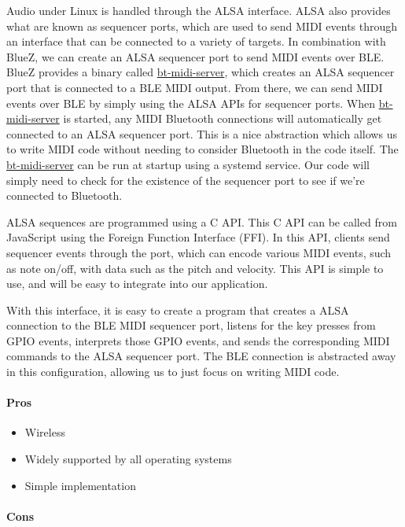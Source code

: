 Audio under Linux is handled through the ALSA interface. ALSA also provides what are known
as sequencer ports, which are used to send MIDI events through an interface that can be
connected to a variety of targets. In combination with BlueZ, we can create an ALSA
sequencer port to send MIDI events over BLE. BlueZ provides a binary called
\url{bt-midi-server}, which creates an ALSA sequencer port that is connected to a BLE MIDI
output. From there, we can send MIDI events over BLE by simply using the ALSA APIs for
sequencer ports. When \url{bt-midi-server} is started, any MIDI Bluetooth connections will
automatically get connected to an ALSA sequencer port. This is a nice abstraction which
allows us to write MIDI code without needing to consider Bluetooth in the code itself. The
\url{bt-midi-server} can be run at startup using a systemd service. Our code will simply
need to check for the existence of the sequencer port to see if we're connected to
Bluetooth.

ALSA sequences are programmed using a C API. This C API can be called from JavaScript
using the Foreign Function Interface (FFI). In this API, clients send sequencer events
through the port, which can encode various MIDI events, such as note on/off, with data
such as the pitch and velocity. This API is simple to use, and will be easy to integrate
into our application.

With this interface, it is easy to create a program that creates a ALSA connection to the
BLE MIDI sequencer port, listens for the key presses from GPIO events, interprets those
GPIO events, and sends the corresponding MIDI commands to the ALSA sequencer port. The BLE
connection is abstracted away in this configuration, allowing us to just focus on writing
MIDI code.

\paragraph{Pros}

\begin{itemize}
  \item Wireless
  \item Widely supported by all operating systems
  \item Simple implementation
\end{itemize}

\paragraph{Cons}

